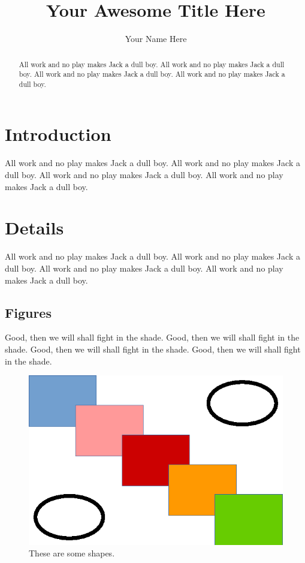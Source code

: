 \documentclass[twocolumn]{article}
\title{\LARGE \bf Your Awesome Title Here}
\author{Your Name Here}
\begin{document}
\maketitle

\begin{abstract}

All work and no play makes Jack a dull boy.
All work and no play makes Jack a dull boy.
All work and no play makes Jack a dull boy.
All work and no play makes Jack a dull boy.

\end{abstract}

\section{Introduction}

All work and no play makes Jack a dull boy.
All work and no play makes Jack a dull boy.
All work and no play makes Jack a dull boy.
All work and no play makes Jack a dull boy.

\section{Details}

All work and no play makes Jack a dull boy.
All work and no play makes Jack a dull boy.
All work and no play makes Jack a dull boy.
All work and no play makes Jack a dull boy.

\subsection{Figures}

Good, then we will shall fight in the shade.
Good, then we will shall fight in the shade.
Good, then we will shall fight in the shade.
Good, then we will shall fight in the shade.

\begin{figure}[h]
\centering
\includegraphics{figures/shapes.eps}
\caption{These are some shapes.}
\label{fig:shapes}
\end{figure}
\end{document}
